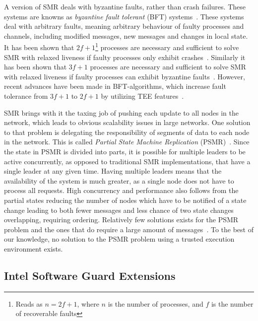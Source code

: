 \documentclass{article}
\begin{document}
		A version of SMR deals with byzantine faults, rather than crash failures.
		These systems are knowns as \textit{byzantine fault tolerant} (BFT) systems~\cite{castro_practical_1999,correia_byzantine_2011,veronese_efficient_2013,liu_scalable_2016}.
		These systems deal with arbitrary faults, meaning arbitrary behaviour of faulty processes and channels, including modified messages, new messages and changes in local state.
		It has been shown that $2f+1$\footnote{Reads as $n=2f+1$, where $n$ is the number of processes, and $f$ is the number of recoverable faults} processes are necessary and sufficient to solve SMR with relaxed liveness if faulty processes only exhibit crashes~\cite{bracha_asynchronous_1985}.
		Similarly it has been shown that $3f+1$ processes are necessary and sufficient to solve SMR with relaxed liveness if faulty processes can exhibit byzantine faults~\cite{bracha_asynchronous_1985,pease_reaching_1980}.
		However, recent advances have been made in BFT-algorithms, which increase fault tolerance from $3f+1$ to $2f+1$ by utilizing TEE features~\cite{liu_scalable_2016,kapitza_cheapbft_2012,veronese_efficient_2013}.

		SMR brings with it the taxing job of pushing each update to all nodes in the network, which leads to obvious scalability issues in large networks.
		One solution to that problem is delegating the responsibility of segments of data to each node in the network.
		This is called \textit{Partial State Machine Replication} (PSMR)~\cite{sousa_partial_2001}.
		Since the state in PSMR is divided into parts, it is possible for multiple leaders to be active concurrently, as opposed to traditional SMR implementations, that have a single leader at any given time.
		Having multiple leaders means that the availability of the system is much greater, as a single node does not have to process all requests.
		High concurrency and performance also follows from the partial states reducing the number of nodes which have to be notified of a state change leading to both fewer messages and less chance of two state changes overlapping, requiring ordering.
		Relatively few solutions exists for the PSMR problem and the ones that do require a large amount of messages~\cite{sousa_partial_2001}.
		To the best of our knowledge, no solution to the PSMR problem using a trusted execution environment exists.

		\subsection{Intel Software Guard Extensions}
		\label{subsec:intel-sgx}
\end{document}
